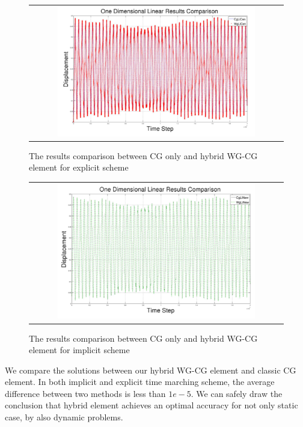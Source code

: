       	      \begin{figure}[H]
      	      	\centering
      	      	\begin{tabular}{c}
      	      		\includegraphics[width=0.8\textwidth]{./pics/result1d2.png}
      	      	\end{tabular}
      	      	\caption{\footnotesize The results comparison between CG only and hybrid WG-CG element for explicit scheme}
      	      \end{figure}
      	      
      	       \begin{figure}[H]
      	       	\centering
      	       	\begin{tabular}{c}
      	       		\includegraphics[width=0.8\textwidth]{./pics/result1d3.png}
      	       	\end{tabular}
      	       	\caption{\footnotesize The results comparison between CG only and hybrid WG-CG element for implicit scheme}
      	       \end{figure}
      	       
      	       We compare the solutions between our hybrid WG-CG element and classic CG element. In both implicit and explicit time marching scheme, the average difference between two methods is less than $ 1e-5 $. We can safely draw the conclusion that hybrid element achieves an optimal accuracy for not only static case, by also dynamic problems.
      	       

